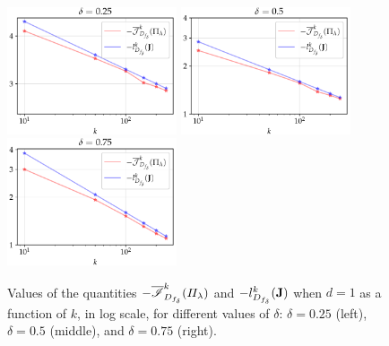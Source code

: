 \begin{figure}[h]
    \centering
    \includegraphics[width=5cm]{figures/va-rp/conv-rates-025.pdf}
    \includegraphics[width=5cm]{figures/va-rp/conv-rates-05.pdf}
    \includegraphics[width=5cm]{figures/va-rp/conv-rates-075.pdf}
    \caption{Values of the quantities $-\overline{\mathscr{I}}^k_{D_{f_\delta}}(\varPi_\lambda)$ and $-l^k_{D_{f_\delta}}(\mathbf{J})$ when $d=1$ as a function of $k$, in log scale, for different values of $\delta$: $\delta=0.25$ (left), $\delta=0.5$ (middle), and $\delta=0.75$ (right).}
    \label{fig:VARP:rateslIM}
\end{figure}








